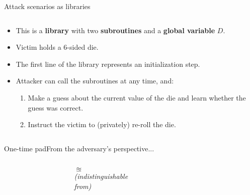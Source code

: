 \documentclass[aspectratio=169, lualatex, handout]{beamer}
\begin{document}
\begin{frame}{Attack scenarios as libraries}
	\begin{columns}[c]
		\begin{column}{0.65\textwidth}
			\begin{itemize}[<+->]
				\item This is a \textbf{library} with two \textbf{subroutines} and a \textbf{global variable} $D$.
				\item Victim holds a 6-sided die.
				\item The first line of the library represents an initialization step.
				\item Attacker can call the subroutines at any time, and:
				      \begin{enumerate}
					      \item Make a guess about the current value of the die and learn whether the guess was correct.
					      \item Instruct the victim to (privately) re-roll the die.
				      \end{enumerate}
			\end{itemize}
		\end{column}
		\begin{column}{0.35\textwidth}
			\vspace{-1cm}
			\begin{center}
			\end{center}
		\end{column}
	\end{columns}
\end{frame}

\begin{frame}{One-time pad}{From the adversary's perspective...}
	\begin{columns}[c]
		\begin{column}{0.35\textwidth}
		\end{column}
		\begin{column}{0.3\textwidth}
			\begin{center}
				{\huge{$\approxeq$}} \\[1em]
				{\scriptsize\textit{(indistinguishable \\ from)}}
			\end{center}
		\end{column}
		\begin{column}{0.35\textwidth}
		\end{column}
	\end{columns}
\end{frame}
\end{document}

